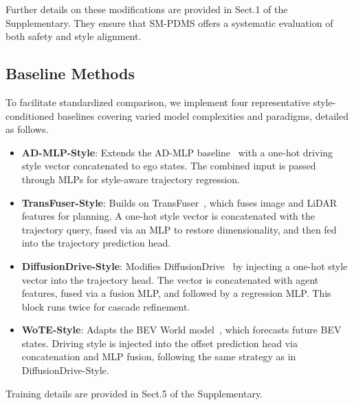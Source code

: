\documentclass{article}
\begin{document}
\noindent Further details  on these modifications are provided in Sect.1 of the Supplementary. They ensure that SM-PDMS offers a systematic evaluation of both safety and style alignment.

\subsection{Baseline Methods}

To facilitate standardized comparison, we implement four representative style-conditioned baselines covering varied model complexities and paradigms, detailed as follows.


\begin{itemize}[leftmargin=1em, topsep=0pt, itemsep=1pt, parsep=0pt]
    \item \textbf{AD-MLP-Style}: Extends the AD-MLP baseline~\cite{zhai2023rethinking} with a one-hot driving style vector concatenated to ego states. The combined input is passed through MLPs for style-aware trajectory regression.
    \item \textbf{TransFuser-Style}: Builds on TransFuser~\cite{chitta2022transfuser}, which fuses image and LiDAR features for planning. A one-hot style vector is concatenated with the trajectory query, fused via an MLP to restore dimensionality, and then fed into the trajectory prediction head.
    \item \textbf{DiffusionDrive-Style}: Modifies DiffusionDrive~\cite{liao2024diffusiondrive} by injecting a one-hot style vector into the trajectory head. The vector is concatenated with agent features, fused via a fusion MLP, and followed by a regression MLP. This block runs twice for cascade refinement.
    \item \textbf{WoTE-Style}: Adapts the BEV World model~\cite{li2025end}, which forecasts future BEV states. Driving style is injected into the offset prediction head via concatenation and MLP fusion, following the same strategy as in DiffusionDrive-Style.
\end{itemize}

\noindent Training details are provided in Sect.5 of the Supplementary.
\end{document}
